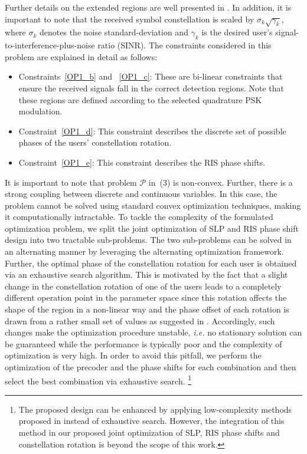 \documentclass[10pt,conference]{IEEEtran}
\begin{document}
Further details on the extended regions are well presented in \cite{li2020tutorial}.
In addition, it is important to note that the received symbol constellation is scaled by $\sigma_k\sqrt{\gamma_k}$, where $\sigma_k$ denotes the noise standard-deviation and $\gamma_k$ is the desired user's signal-to-interference-plus-noise ratio (SINR).
The constraints considered in this problem are explained in detail as follows:
\begin{itemize}
    \item Constraints~\ref{OP1_b} and ~\ref{OP1_c}: These are bi-linear constraints that ensure the received signals fall in the correct detection regions. Note that these regions are defined according to the selected quadrature PSK modulation.
    \item Constraint~\ref{OP1_d}: This constraint describes the discrete set of possible phases of the users' constellation rotation.
    \item Constraint~\ref{OP1_e}: This constraint describes the RIS phase shifts.
\end{itemize} 
It is important to note that problem $\mathscr{P}$ in~(3) is non-convex. Further, there is a strong coupling between discrete and continuous variables. In this case, the problem cannot be solved using standard convex optimization techniques, making it computationally intractable. To tackle the complexity of the formulated optimization problem, we split the joint optimization of SLP and RIS phase shift design into two tractable sub-problems. The two sub-problems can be solved in an alternating manner by leveraging the alternating optimization framework. Further, the optimal phase of the constellation rotation for each user is obtained via an exhaustive search algorithm. This is motivated by the fact that a slight change in the constellation rotation of one of the users leads to a completely different operation point in the parameter space since this rotation affects the shape of the region in a non-linear way and the phase offset of each rotation is drawn from a rather small set of values as suggested in \cite{kisseleff2021symbol}. Accordingly, such changes make the optimization procedure unstable, \textit{i.e.} no stationary solution can be guaranteed while the performance is typically poor and the complexity of optimization is very high. In order to avoid this pitfall, we perform the optimization of the precoder and the phase shifts for each combination and then select the best combination via exhaustive search. \footnote{The proposed design can be enhanced by applying low-complexity methods proposed in \cite{9984648} instead of exhaustive search. However, the integration of this method in our proposed joint optimization of SLP, RIS phase shifts and constellation rotation is beyond the scope of this work.}
\end{document}
